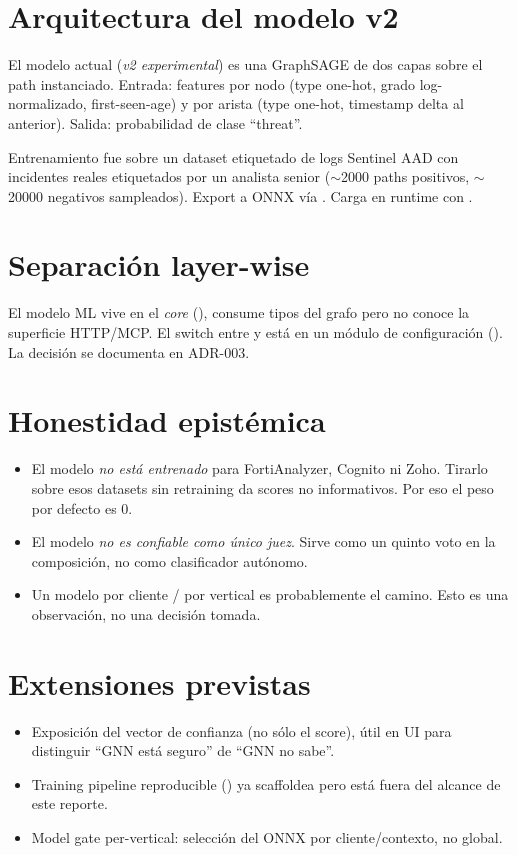 \section{Arquitectura del modelo v2}

El modelo actual (\emph{v2 experimental}) es una GraphSAGE de dos
capas sobre el path instanciado. Entrada: features por nodo
(type one-hot, grado log-normalizado, first-seen-age) y por
arista (type one-hot, timestamp delta al anterior). Salida:
probabilidad de clase ``threat''.

Entrenamiento fue sobre un dataset etiquetado de logs Sentinel AAD
con incidentes reales etiquetados por un analista senior
($\sim$2000 paths positivos, $\sim$20000 negativos sampleados).
Export a ONNX vía . Carga en runtime con .

\section{Separación layer-wise}

El modelo ML vive en el \emph{core} (), consume
tipos del grafo pero no conoce la superficie HTTP/MCP. El switch
entre  y  está en un módulo de
configuración (). La
decisión se documenta en ADR-003.

\section{Honestidad epistémica}

\begin{itemize}
    \item El modelo \emph{no está entrenado} para FortiAnalyzer,
    Cognito ni Zoho. Tirarlo sobre esos datasets sin retraining
    da scores no informativos. Por eso el peso por defecto es 0.
    \item El modelo \emph{no es confiable como único juez}. Sirve
    como un quinto voto en la composición, no como clasificador
    autónomo.
    \item Un modelo por cliente / por vertical es probablemente el
    camino. Esto es una observación, no una decisión tomada.
\end{itemize}

\section{Extensiones previstas}

\begin{itemize}
    \item Exposición del vector de confianza (no sólo el score), útil
    en UI para distinguir ``GNN está seguro'' de ``GNN no
    sabe''.
    \item Training pipeline reproducible ()
    ya scaffoldea pero está fuera del alcance de este reporte.
    \item Model gate per-vertical: selección del ONNX por
    cliente/contexto, no global.
\end{itemize}
